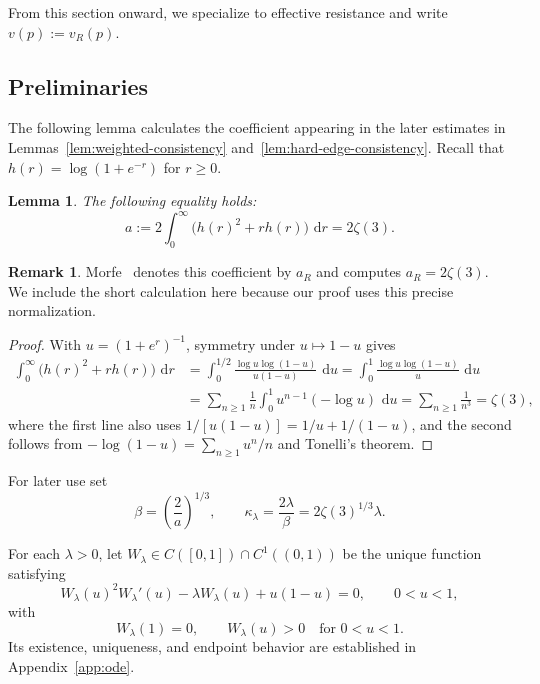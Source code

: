 \documentclass[12pt]{amsart}
\numberwithin{equation}{section}
\theoremstyle{plain}
\newtheorem{lemma}[theorem]{Lemma}
\theoremstyle{definition}
\newtheorem{remark}[theorem]{Remark}
\newcommand{\dd}{\,\mathrm d}
\begin{document}
From this section onward, we specialize to effective resistance and write
$v(p):=v_R(p)$.

\subsection{Preliminaries}

The following lemma calculates the coefficient appearing in the later
estimates in Lemmas~\ref{lem:weighted-consistency}
and~\ref{lem:hard-edge-consistency}.
Recall that \(h(r)=\log(1+e^{-r})\) for \(r\ge0\).

\begin{lemma}
\label{lem:diffusion-coefficient}
The following equality holds:
\begin{equation*}
a:=2\int_0^\infty\bigl(h(r)^2+rh(r)\bigr)\,\dd r=2\zeta(3).
\end{equation*}

\end{lemma}
\begin{remark}
   Morfe~\cite[Appendix~C]{Morfe2026} denotes this coefficient by \(a_R\)
and computes \(a_R=2\zeta(3)\). We include the short calculation here
because our proof uses this precise normalization.
\end{remark}
\begin{proof}

With $u=(1+e^r)^{-1}$, symmetry under $u\mapsto1-u$ gives
\[
\begin{aligned}
\int_0^\infty\bigl(h(r)^2+rh(r)\bigr)\,\dd r
 &=\int_0^{1/2}
   \frac{\log u\log(1-u)}{u(1-u)}\,\dd u
 =\int_0^1\frac{\log u\log(1-u)}u\,\dd u\\
 &=\sum_{n\ge1}\frac1n
   \int_0^1u^{n-1}(-\log u)\,\dd u
 =\sum_{n\ge1}\frac1{n^3}
 =\zeta(3),
\end{aligned}
\]
where the first line also uses
$1/[u(1-u)]=1/u+1/(1-u)$, and the second follows from
$-\log(1-u)=\sum_{n\ge1}u^n/n$ and Tonelli's theorem.
\end{proof}

For later use set
\begin{equation}
 \beta=\left(\frac2a\right)^{1/3},
 \qquad
 \kappa_{\lambda}=\frac{2\lambda}{\beta}=2\zeta(3)^{1/3}\lambda.
 \label{eq:beta-kappa}
\end{equation}

For each $\lambda>0$, let
$W_\lambda\in C([0,1])\cap C^1((0,1))$ be the unique function satisfying
\[
W_\lambda(u)^2W_\lambda'(u)-\lambda W_\lambda(u)+u(1-u)=0,
\qquad 0<u<1,
\]
with
\[
W_\lambda(1)=0,
\qquad
W_\lambda(u)>0
\quad\text{for }0<u<1.
\]
Its existence, uniqueness, and endpoint behavior are established in
Appendix~\ref{app:ode}.
\end{document}
